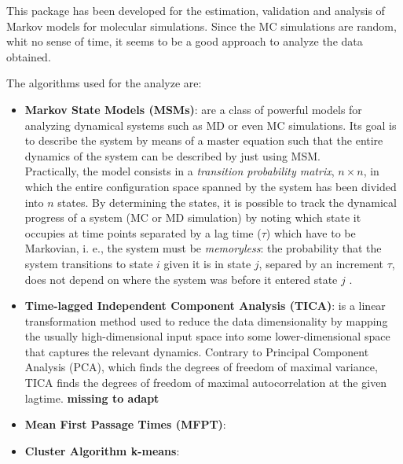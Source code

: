 \documentclass[
  journal=usp, %
  manuscript=final-report,
  year=2023,
  volume=1,
]{cup-journal}
\begin{document}
This package has been developed for the estimation, validation and analysis of Markov models for molecular simulations. Since the MC simulations are random, whit no sense of time, it seems to be a good approach to analyze the data obtained.

The algorithms used for the analyze are:

\begin{itemize}
    
    \item  \textbf{Markov State Models (MSMs)}: are a class of powerful models for analyzing dynamical systems such as MD or even MC simulations. Its goal is to describe the system by means of a master equation such that the entire dynamics of the system can be described by just using MSM. \\
    
    Practically, the model consists in a \textit{transition probability matrix}, $n \times n$, in which the entire configuration space spanned by the system has been divided into $n$ states. By determining the states, it is possible to track the dynamical progress of a system (MC or MD simulation) by noting which state it occupies at time points separated by a lag time ($\tau$) which have to be Markovian, i. e., the system must be \textit{memoryless}: the probability that the system transitions to state $i$ given it is in state $j$, separed by an increment $\tau$, does not depend on where the system was before it entered state $j$ \cite{MSM}.\\

    
    \item  \textbf{Time-lagged Independent Component Analysis (TICA)}: 
    is a linear transformation method used to reduce the data dimensionality by mapping the usually high-dimensional input space into some lower-dimensional space that captures the relevant dynamics. Contrary to Principal Component Analysis (PCA), which finds the degrees of freedom of maximal variance, TICA finds the degrees of freedom of maximal autocorrelation at the given lagtime. 
    \textbf{missing to adapt} \\

    \item \textbf{Mean First Passage Times (MFPT)}:  \\
        
    \item \textbf{Cluster Algorithm k-means}:




    
\end{itemize}
\end{document}
